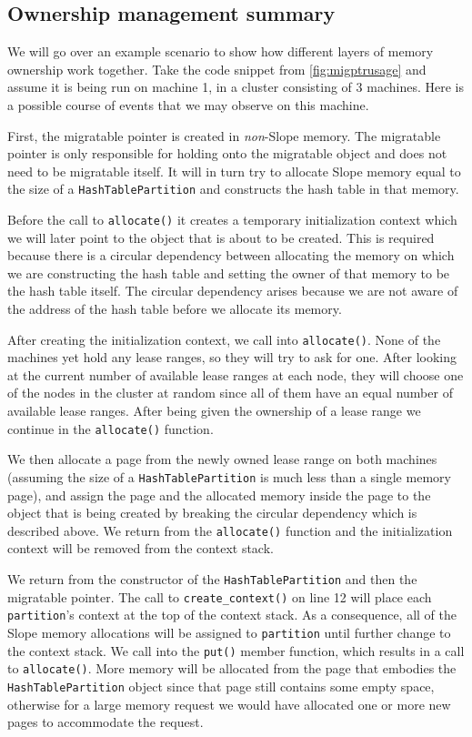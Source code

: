 \subsection{Ownership management summary}
We will go over an example scenario to show how different layers of memory
ownership work together. Take the code snippet from \autoref{fig:migptrusage}
and assume it is being run on machine 1, in a cluster consisting of 3 machines.
Here is a possible course of events that we may observe on this machine.

First, the migratable pointer is created in \emph{non}-Slope memory. The
migratable pointer is only responsible for holding onto the migratable object
and does not need to be migratable itself. It will in turn try to allocate
Slope memory equal to the size of a \texttt{HashTablePartition} and constructs the
hash table in that memory.

Before the call to \texttt{allocate()} it creates
a temporary initialization context which we will later point to the object
that is about to be created. This is required because there is a circular
dependency between allocating the memory on which we are constructing the
hash table and setting the owner of that memory to be the hash table itself.
The circular dependency arises because we are not aware of the address of the
hash table before we allocate its memory.

After creating the initialization context, we call into \texttt{allocate()}.
None of the machines yet hold any lease ranges, so they will try to ask for one.
After looking at the current number of available lease ranges at each node,
they will choose one of the nodes in the cluster at random since all of them
have an equal number of available lease ranges. After being given
the ownership of a lease range we continue in the \texttt{allocate()} function.

We then allocate a page from the newly owned lease range on both machines (assuming the size of
a \texttt{HashTablePartition} is much less than a single memory page), and assign the
page and the allocated memory inside the page to the object that is being
created by breaking the circular dependency which is described above.
We return from the \texttt{allocate()} function and the initialization context
will be removed from the context stack.

We return from the constructor of the \texttt{HashTablePartition} and then
the migratable pointer. The call to \texttt{create\_context()} on line 12
will place each
\texttt{partition}'s context at the top of the context stack. As a consequence, all of the
Slope memory allocations will be assigned to \texttt{partition} until further change
to the context stack. We call into the \texttt{put()} member function, which
results in a call to \texttt{allocate()}. More memory will be allocated from
the page that embodies the \texttt{HashTablePartition} object since that page
still contains some empty space, otherwise for a large memory request we would
have allocated one or more new pages to accommodate the request.

